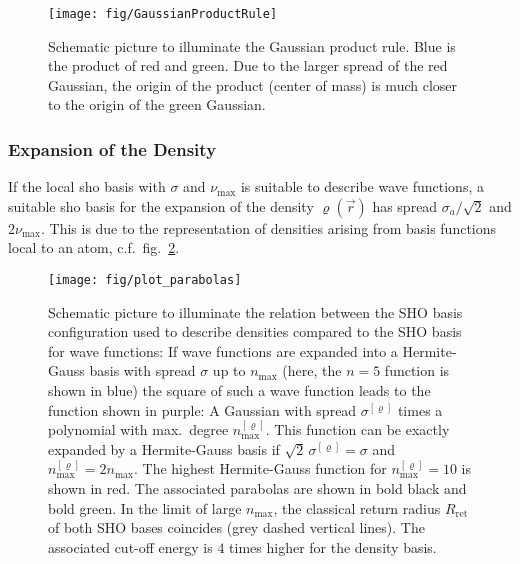 \documentclass[oribibl]{llncs}
\newcommand{\um}[1]{_{\mathrm{#1}}}
\begin{document}
%
\begin{figure}
  \begin{minipage}[c]{.990\textwidth}
	\texttt{[image: fig/GaussianProductRule]} %
  \end{minipage}\hfill
  \begin{minipage}[c]{.009\textwidth}
  \end{minipage}
  \label{fig:GaussianProductRule}
  \caption{
Schematic picture to illuminate the Gaussian product rule. Blue is the product of red and green.
Due to the larger spread of the red Gaussian, the origin of the product (center of mass) is much closer to
the origin of the green Gaussian.
  }
\end{figure}
%
%


\subsubsection{Expansion of the Density}
If the local \ac{sho} basis with $\sigma$ and $\nu\um{max}$
is suitable to describe wave functions, 
a suitable \ac{sho} basis for the expansion of the density $\varrho(\vec r)$ has
spread $\sigma_a/\sqrt{2}$ and $2\nu\um{max}$.
This is due to the representation of densities
arising from basis functions local to an atom, c.f.~fig.~\ref{fig:plot_parabolas}.
%
\begin{figure}
  \begin{minipage}[c]{.990\textwidth}
	\texttt{[image: fig/plot\_parabolas]} %
  \end{minipage}\hfill
  \begin{minipage}[c]{.009\textwidth}
  \end{minipage}
  \label{fig:plot_parabolas}
  \caption{
Schematic picture to illuminate the relation between the SHO basis configuration 
used to describe densities
compared to the SHO basis for wave functions:
If wave functions are expanded into a Hermite-Gauss basis with spread $\sigma$
up to $n\um{max}$ (here, the $n = 5$ function is shown in blue)
the square of such a wave function leads to the function shown in purple:
A Gaussian with spread $\sigma^{[\varrho]}$ times a polynomial with max.~degree $n\um{max}^{[\varrho]}$.
This function can be exactly expanded by a Hermite-Gauss basis if
$\sqrt{2}\,\sigma^{[\varrho]} = \sigma$
and
$n\um{max}^{[\varrho]} = 2n\um{max}$.
The highest Hermite-Gauss function for $n\um{max}^{[\varrho]} = 10$ is shown in red.
The associated parabolas are shown in bold black and bold green.
In the limit of large $n\um{max}$, the classical return radius $R\um{ret}$
of both SHO bases coincides (grey dashed vertical lines).
The associated cut-off energy is $4$ times higher for the density basis.
  }
\end{figure}
%
%
\end{document}
